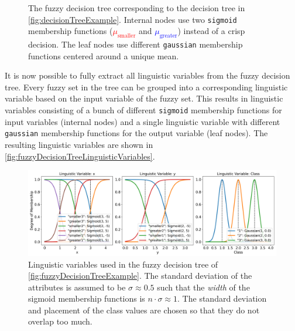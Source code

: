 \begin{figure}[H]

    \caption[Fuzzy decision tree created from the regular decision tree]{The fuzzy decision tree corresponding to the decision tree in \autoref{fig:decisionTreeExample}. Internal nodes use two \texttt{sigmoid} membership functions (\textcolor{red}{$\mu_{\text{smaller}}$} and \textcolor{blue}{$\mu_{\text{greater}}$}) instead of a crisp decision. The leaf nodes use different \texttt{gaussian} membership functions centered around a unique mean.}

    \label{fig:fuzzyDecisionTreeExample}
\end{figure}

It is now possible to fully extract all linguistic variables from the fuzzy decision tree. Every fuzzy set in the tree can be grouped into a corresponding linguistic variable based on the input variable of the fuzzy set. This results in linguistic variables consisting of a bunch of different \texttt{sigmoid} membership functions for input variables (internal nodes) and a single linguistic variable with different \texttt{gaussian} membership functions for the output variable (leaf nodes). The resulting linguistic variables are shown in \autoref{fig:fuzzyDecisionTreeLinguisticVariables}.


\begin{figure}[h]
    \centering

    \includegraphics[width=\linewidth]{figures/ProofOfConcepts/fuzzy_sets.png}

    \caption[Linguistic variables for the converted fuzzy decision tree]{Linguistic variables used in the fuzzy decision tree of \autoref{fig:fuzzyDecisionTreeExample}. The standard deviation of the attributes is assumed to be $\sigma \approx 0.5$ such that the \emph{width} of the sigmoid membership functions is $n\cdot \sigma \approx 1$. The standard deviation and placement of the class values are chosen so that they do not overlap too much.}
    \label{fig:fuzzyDecisionTreeLinguisticVariables}
\end{figure}

